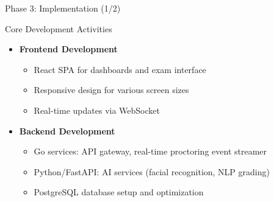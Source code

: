 \begin{frame}{Phase 3: Implementation (1/2)}
    \begin{block}{Core Development Activities}
        \begin{itemize}
            \item \textbf{Frontend Development}
            \begin{itemize}
                \item React SPA for dashboards and exam interface
                \item Responsive design for various screen sizes
                \item Real-time updates via WebSocket
            \end{itemize}
            
            \item \textbf{Backend Development}
            \begin{itemize}
                \item Go services: API gateway, real-time proctoring event streamer
                \item Python/FastAPI: AI services (facial recognition, NLP grading)
                \item PostgreSQL database setup and optimization
            \end{itemize}
        \end{itemize}
    \end{block}
\end{frame}


